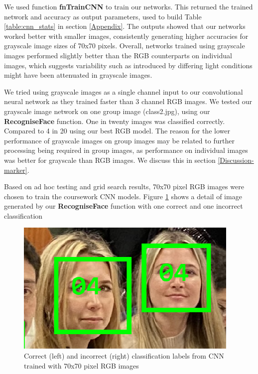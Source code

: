 We used function \textbf{fnTrainCNN} to train our networks. This returned the trained network and accuracy as output parameters, used to build Table \ref{table:cnn_stats} in section \ref{Appendix}. The outputs showed that our networks worked better with smaller images, consistently generating higher accuracies for grayscale image sizes of 70x70 pixels. Overall, networks trained using grayscale images performed slightly better than the RGB counterparts on individual images, which suggests variability such as introduced by differing light conditions might have been attenuated in grayscale images. 

We tried using grayscale images as a single channel input to our convolutional neural network as they trained faster than 3 channel RGB images. We tested our grayscale image network on one group image (class2.jpg), using our \textbf{RecogniseFace} function. One in twenty images was classified correctly. Compared to 4 in 20 using our best RGB model. The reason for the lower performance of grayscale images on group images may be related to further processing being required in group images, as performance on individual images was better for grayscale than RGB images. We discuss this in section \ref{Discussion-marker}.

Based on ad hoc testing and grid search results, 70x70 pixel RGB images were chosen to train the coursework CNN models. Figure \ref{fig:cnn_correct_incorrect} shows a detail of image generated by our \textbf{RecogniseFace} function with one correct and one incorrect classification
\begin{figure}[ht]
 \centering 
 \includegraphics[width=\columnwidth]{images/correct-incorrect.png}
 \caption{Correct (left) and incorrect (right) classification labels from CNN trained with 70x70 pixel RGB images}
 \label{fig:cnn_correct_incorrect}
\end{figure}

